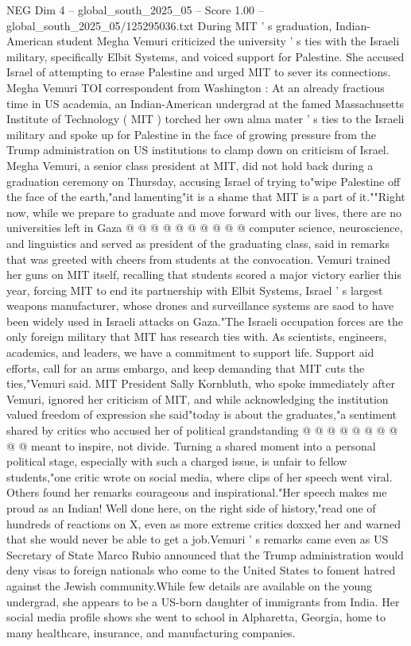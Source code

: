 \begin{textsample}{NEG Dim 4 – global\_south\_2025\_05 – Score 1.00 – global\_south\_2025\_05/125295036.txt}  \label{ex:f4_neg_362}
During MIT ' s graduation, Indian-American student Megha Vemuri criticized the university ' s ties with the Israeli military, specifically Elbit Systems, and voiced support for Palestine.
She accused Israel of attempting to erase Palestine and urged MIT to sever its connections.
Megha Vemuri TOI correspondent from Washington : At an already fractious time in US academia, an Indian-American undergrad at the famed Massachusetts Institute of Technology ( MIT ) torched her own alma mater ' s ties to the Israeli military and spoke up for Palestine in the face of growing pressure from the Trump administration on US institutions to clamp down on criticism of Israel.
Megha Vemuri, a senior class president at MIT, did not hold back during a graduation ceremony on Thursday, accusing Israel of trying to"wipe Palestine off the face of the earth,"and lamenting"it is a shame that MIT is a part of it.""Right now, while we prepare to graduate and move forward with our lives, there are no universities left in Gaza @ @ @ @ @ @ @ @ @ @ computer science, neuroscience, and linguistics and served as president of the graduating class, said in remarks that was greeted with cheers from students at the convocation.
Vemuri trained her guns on MIT itself, recalling that students scored a major victory earlier this year, forcing MIT to end its partnership with Elbit Systems, Israel ' s largest weapons manufacturer, whose drones and surveillance systems are saod to have been widely used in Israeli attacks on Gaza."The Israeli occupation forces are the only foreign military that MIT has research ties with.
As scientists, engineers, academics, and leaders, we have a commitment to support life.
Support aid efforts, call for an arms embargo, and keep demanding that MIT cuts the ties,"Vemuri said.
MIT President Sally Kornbluth, who spoke immediately after Vemuri, ignored her criticism of MIT, and while acknowledging the institution valued freedom of expression she said"today is about the graduates,"a sentiment shared by critics who accused her of political grandstanding @ @ @ @ @ @ @ @ @ @ meant to inspire, not divide.
Turning a shared moment into a personal political stage, especially with such a charged issue, is unfair to fellow students,"one critic wrote on social media, where clips of her speech went viral.
Others found her remarks courageous and inspirational."Her speech makes me proud as an Indian!
Well done here, on the right side of history,"read one of hundreds of reactions on X, even as more extreme critics doxxed her and warned that she would never be able to get a job.Vemuri ' s remarks came even as US Secretary of State Marco Rubio announced that the Trump administration would deny visas to foreign nationals who come to the United States to foment hatred against the Jewish community.While few details are available on the young undergrad, she appears to be a US-born daughter of immigrants from India.
Her social media profile shows she went to school in Alpharetta, Georgia, home to many healthcare, insurance, and manufacturing companies.

\end{textsample}
